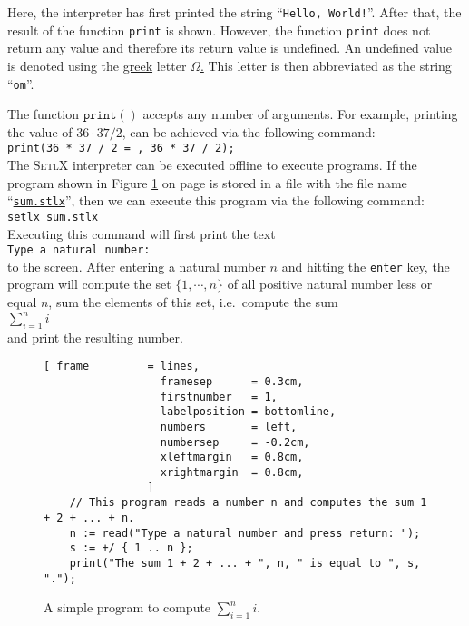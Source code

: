Here, the interpreter has first printed the string ``\texttt{Hello, World!}''.  After that, the
result of the function \texttt{print} is shown.  However, the function \texttt{print} does not
return any value and therefore its return value is undefined.  An undefined value is denoted using
the \href{http://en.wikipedia.org/wiki/Greek_alphabet}{greek} letter
\href{https://en.wikipedia.org/wiki/Omega}{$\Omega$.}  This letter is then
abbreviated as the string ``\texttt{om}''.

The function $\mathtt{print}()$ accepts any number of arguments.  For example, printing
the value of $36 \cdot 37 / 2$, can be achieved via the following command:
\\[0.2cm]
\hspace*{1.3cm}
\texttt{print(36 * 37 / 2 = , 36 * 37 / 2);}
\\[0.2cm]
The  \textsc{SetlX} interpreter can be executed offline to execute programs.
If the program shown in Figure  \ref{fig:sum.stlx} on page \pageref{fig:sum.stlx} is stored in a
file with the file name  
``\href{https://github.com/karlstroetmann/Logik/blob/master/SetlX/sum.stlx}{\texttt{sum.stlx}}'',
then we can execute this program via the following command:
\\[0.2cm]
\hspace*{1.3cm}
\texttt{setlx sum.stlx}
\\[0.2cm] 
Executing this command will first print the text
\\[0.2cm]
\hspace*{1.3cm}
\texttt{Type a natural number:} 
\\[0.2cm]
to the screen.  After entering a natural number $n$ and hitting the \texttt{enter} key, the program will
compute the set $\{1,\cdots,n\}$ of all positive natural number less or equal $n$, sum the elements
of this set, i.e.~compute the sum
\\[0.2cm]
\hspace*{1.3cm}
$\sum\limits_{i=1}^n i$ 
\\[0.2cm]
and print the resulting number.

\begin{figure}[!ht]
\centering
\begin{Verbatim}[ frame         = lines, 
                  framesep      = 0.3cm, 
                  firstnumber   = 1,
                  labelposition = bottomline,
                  numbers       = left,
                  numbersep     = -0.2cm,
                  xleftmargin   = 0.8cm,
                  xrightmargin  = 0.8cm,
                ]
    // This program reads a number n and computes the sum 1 + 2 + ... + n.
    n := read("Type a natural number and press return: ");
    s := +/ { 1 .. n };
    print("The sum 1 + 2 + ... + ", n, " is equal to ", s, ".");
\end{Verbatim}
\vspace*{-0.3cm}
\caption{A simple program to compute $\sum\limits_{i=1}^n i$.}
\label{fig:sum.stlx}
\end{figure}


